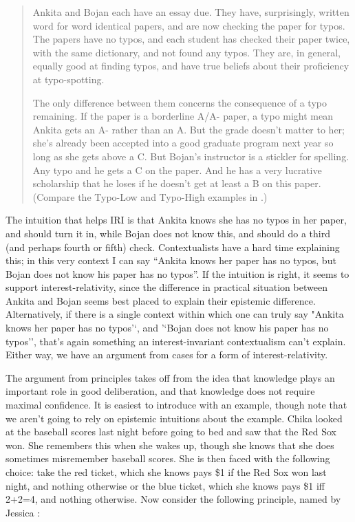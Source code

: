 \begin{quote}

Ankita and Bojan each have an essay due. They have, surprisingly, written word for word identical papers, and are now checking the paper for typos. The papers have no typos, and each student has checked their paper twice, with the same dictionary, and not found any typos. They are, in general, equally good at finding typos, and have true beliefs about their proficiency at typo-spotting. 

The only difference between them concerns the consequence of a typo remaining. If the paper is a borderline A\slash A- paper, a typo might mean Ankita gets an A- rather than an A. But the grade doesn't matter to her; she's already been accepted into a good graduate program next year so long as she gets above a C. But Bojan's instructor is a stickler for spelling. Any typo and he gets a C on the paper. And he has a very lucrative scholarship that he loses if he doesn't get at least a B on this paper. (Compare the Typo-Low and Typo-High examples in  \citet[199]{Pinillos2012}.)
\end{quote}
The intuition that helps IRI is that Ankita knows she has no typos in her paper, and should turn it in, while Bojan does not know this, and should do a third (and perhaps fourth or fifth) check. Contextualists have a hard time explaining this; in this very context I can say ``Ankita knows her paper has no typos, but Bojan does not know his paper has no typos''. If the intuition is right, it seems to support interest-relativity, since the difference in practical situation between Ankita and Bojan seems best placed to explain their epistemic difference. Alternatively, if there is a single context within which one can truly say "Ankita knows her paper has no typos'`, and '`Bojan does not know his paper has no typos'', that's again something an interest-invariant contextualism can't explain. Either way, we have an argument from cases for a form of interest-relativity.

The argument from principles takes off from the idea that knowledge plays an important role in good deliberation, and that knowledge does not require maximal confidence. It is easiest to introduce with an example, though note that we aren't going to rely on epistemic intuitions about the example. Chika looked at the baseball scores last night before going to bed and saw that the Red Sox won. She remembers this when she wakes up, though she knows that she does sometimes misremember baseball scores. She is then faced with the following choice: take the red ticket, which she knows pays \$1 if the Red Sox won last night, and nothing otherwise or the blue ticket, which she knows pays \$1 iff 2+2=4, and nothing otherwise. Now consider the following principle, named by Jessica  \citet{Brown2013}:

